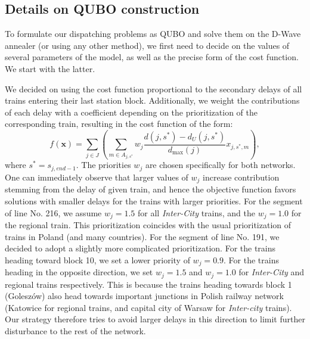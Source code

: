 \subsection{Details on QUBO construction}

To formulate our dispatching problems as QUBO and solve them on the D-Wave
annealer (or using any other method), we first need to decide on the values of
several parameters of the model, as well as the precise form of the cost
function. We start with the latter.

We decided on using the cost function proportional to the secondary delays of
all trains entering their last station block. Additionally, we weight the
contributions of each delay with a coefficient depending on the prioritization
of the corresponding train, resulting in the cost function of the form:
\begin{equation}
  f(\mathbf{x}) = \sum_{j \in J}\left(\sum_{m  \in A_{j,s^{*}}}w_{j} \frac{d(j,s^{*}) - d_{U}(j,s^{*})}{d_{\max}(j)}x_{j,s^{*},m}\right),
\end{equation}
where $s^{*} = s_{j,end-1}$. The priorities $w_{j}$ are chosen specifically for
both networks. One can immediately observe that larger values of $w_{j}$
increase contribution stemming from the delay of given train, and hence the
objective function favors solutions with smaller delays for the trains with
larger priorities. For the segment of line No. 216, we assume $w_{j}= 1.5$ for
all \emph{Inter-City} trains, and the $w_{j}=1.0$ for the regional train. This
prioritization coincides with the usual prioritization of trains in Poland (and
many countries). For the segment of line No. 191, we decided to adopt a
slightly more complicated prioritization. For the trains heading toward block
10, we set a lower priority of $w_{j}=0.9$. For the trains heading in the
opposite direction, we set $w_{j}=1.5$ and $w_{j}=1.0$ for \emph{Inter-City}
and regional trains respectively. This is because the trains heading towards
block 1 (Goleszów) also head towards important junctions in Polish railway
network (Katowice for regional trains, and capital city of Warsaw for
\emph{Inter-city} trains). Our strategy therefore tries to avoid larger delays
in this direction to limit further disturbance to the rest of the network.

